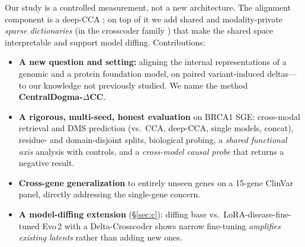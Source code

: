 \documentclass[10pt]{article}
\begin{document}
Our study is a controlled measurement, not a new architecture. The alignment component is a
deep-CCA \citep{andrew2013dcca}; on top of it we add shared and modality-private \emph{sparse
dictionaries} (in the crosscoder family \citep{lindsey2024crosscoders}) that make the shared
space interpretable and support model diffing. Contributions:
\begin{itemize}\itemsep2pt
\item \textbf{A new question and setting:} aligning the internal representations of a genomic and
a protein foundation model, on paired variant-induced deltas---to our knowledge not previously
studied. We name the method \textbf{CentralDogma-$\Delta$CC}.
\item \textbf{A rigorous, multi-seed, honest evaluation} on BRCA1 SGE: cross-modal retrieval and
DMS prediction (vs.\ CCA, deep-CCA, single models, concat), residue- and domain-disjoint splits,
biological probing, a \emph{shared functional axis} analysis with controls, and a
\emph{cross-model causal probe} that returns a negative result.
\item \textbf{Cross-gene generalization} to entirely unseen genes on a 15-gene ClinVar panel,
directly addressing the single-gene concern.
\item \textbf{A model-diffing extension} (\S\ref{sec:c}): diffing base vs.\ LoRA-disease-fine-tuned
Evo\,2 with a Delta-Crosscoder \citep{kassem2026delta} shows narrow fine-tuning
\emph{amplifies existing latents} rather than adding new ones.
\end{itemize}
\end{document}
